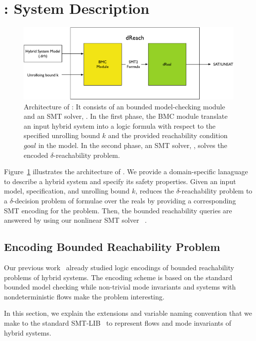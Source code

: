 \section{\dReach{}: System Description}
\begin{figure}
  \centering
  \includegraphics[width=\textwidth]{images/dReach}
  \caption{Architecture of \dReach{}: It consists of an bounded
    model-checking module and an SMT solver, \dReal{}. In the first
    phase, the BMC module translate an input hybrid system into a
    logic formula with respect to the specified unrolling bound $k$
    and the provided reachability condition $\textit{goal}$ in the
    model. In the second phase, an SMT solver, \dReal{}, solves the
    encoded $\delta$-reachability problem.}
  \label{fig:system-description}
\end{figure}

Figure~\ref{fig:system-description} illustrates the architecture of
\dReach{}. We provide a domain-specific lanaguage to describe a hybrid
system and specify its safety properties. Given an input model,
specification, and unrolling bound $k$, \dReach{} reduces the
$\delta$-reachability problem to a $\delta$-decision problem of
formulae over the reals by providing a corresponding SMT encoding for
the problem. Then, the bounded reachability queries are answered by
using our nonlinear SMT solver \dReal{}~\cite{DBLP:conf/cade/GaoKC13}.

\subsection{Encoding Bounded Reachability Problem}

Our previous work~\cite{DBLP:journals/corr/GaoKCC14} already studied
logic encodings of bounded reachability problems of hybrid
systems. The encoding scheme is based on the standard bounded model
checking while non-trivial mode invariants and systems with
nondeterministic flows make the problem interesting.

In this section, we explain the extensions and variable naming
convention that we make to the standard SMT-LIB~\cite{BarST-SMT-10} to
represent flows and mode invariants of hybrid systems.

